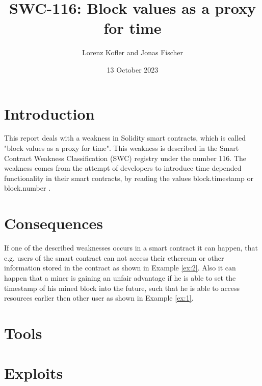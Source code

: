 \documentclass{article}
\title{SWC-116: Block values as a proxy for time}
\author{Lorenz Kofler and Jonas Fischer}
\date{13 October 2023}
\begin{document}
\maketitle
\tableofcontents
\newpage

\section{Introduction}
This report deals with a weakness in Solidity smart contracts, which is called
"block values as a proxy for time". This weakness is described in the Smart
Contract Weakness Classification (SWC) registry under the number 116. \newline
The weakness comes from the attempt of developers to introduce time depended
functionality in their smart contracts, by reading the values block.timestamp
or block.number \cite{swc116}. \newline





\section{Consequences}
If one of the described weaknesses occurs in a smart contract it can happen, that e.g. users of the smart contract can not access
their ethereum or other information stored in the contract as shown in Example \ref{ex:2}. \newline
Also it can happen that a miner is gaining an unfair advantage if he is able to set the timestamp of his mined block into the future,
such that he is able to access resources earlier then other user as shown in Example \ref{ex:1}.

\section{Tools}
\section{Exploits}


\end{document}
